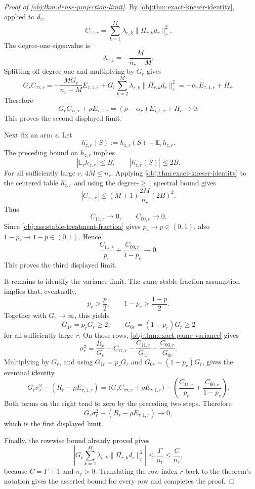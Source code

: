 \begin{proof}[Proof of \cref{obj:thm:dense-projection-limit}]
By \cref{obj:thm:exact-kneser-identity}, applied to \(d_r\),
\[
C_{\tau\tau,r}
=
\sum_{k=1}^{M}\lambda_{r,k}\|\Pi_{r,k}d_r\|_r^2 .
\]
The degree-one eigenvalue is
\[
\lambda_{r,1}=-\frac{M}{n_r-M}.
\]
Splitting off degree one and multiplying by \(G_r\) gives
\[
G_rC_{\tau\tau,r}
=
-\frac{MG_r}{n_r-M}E_{\tau,1,r}
+
G_r\sum_{k=2}^{M}\lambda_{r,k}\|\Pi_{r,k}d_r\|_r^2
=
-\alpha_r E_{\tau,1,r}+H_r .
\]
Therefore
\[
G_rC_{\tau\tau,r}+\rho E_{\tau,1,r}
=
(\rho-\alpha_r)E_{\tau,1,r}+H_r
\to0 .
\]
This proves the second displayed limit.

Next fix an arm \(z\).  Let
\[
h_{z,r}^{\circ}(S):=h_{z,r}(S)-\mathbb E_r h_{z,r}.
\]
The preceding bound on \(h_{z,r}\) implies
\[
|\mathbb E_r h_{z,r}|\le B,
\qquad
|h_{z,r}^{\circ}(S)|\le2B .
\]
For all sufficiently large \(r\), \(4M\le n_r\).  Applying \cref{obj:thm:exact-kneser-identity} to the centered table \(h_{z,r}^{\circ}\) and using the degree-\(\ge1\) spectral bound gives
\[
|C_{zz,r}|
\le
(M+1)\frac{2M}{n_r}(2B)^2 .
\]
Thus
\[
C_{11,r}\to0,
\qquad
C_{00,r}\to0 .
\]
Since \cref{obj:ass:stable-treatment-fraction} gives \(p_r\to p\in(0,1)\), also \(1-p_r\to1-p\in(0,1)\).  Hence
\[
\frac{C_{11,r}}{p_r}
+
\frac{C_{00,r}}{1-p_r}
\to0 .
\]
This proves the third displayed limit.

It remains to identify the variance limit.  The same stable-fraction assumption implies that, eventually,
\[
p_r>\frac p2,
\qquad
1-p_r>\frac{1-p}{2}.
\]
Together with \(G_r\to\infty\), this yields
\[
G_{1r}=p_rG_r\ge2,
\qquad
G_{0r}=(1-p_r)G_r\ge2
\]
for all sufficiently large \(r\).  On those rows, \cref{obj:thm:exact-pame-variance} gives
\[
\sigma_r^2
=
\frac{R_r}{G_r}
+
C_{\tau\tau,r}
-
\frac{C_{11,r}}{G_{1r}}
-
\frac{C_{00,r}}{G_{0r}} .
\]
Multiplying by \(G_r\), and using \(G_{1r}=p_rG_r\) and \(G_{0r}=(1-p_r)G_r\), gives the eventual identity
\[
G_r\sigma_r^2-(R_r-\rho E_{\tau,1,r})
=
\bigl(G_rC_{\tau\tau,r}+\rho E_{\tau,1,r}\bigr)
-
\left(
\frac{C_{11,r}}{p_r}
+
\frac{C_{00,r}}{1-p_r}
\right).
\]
Both terms on the right tend to zero by the preceding two steps.  Therefore
\[
G_r\sigma_r^2-(R_r-\rho E_{\tau,1,r})\to0,
\]
which is the first displayed limit.

Finally, the rowwise bound already proved gives
\[
\left|
G_r\sum_{k=2}^{M}\lambda_{r,k}\|\Pi_{r,k}d_r\|_r^2
\right|
\le
\frac{\Gamma}{n_r}
\le
\frac{C}{n_r},
\]
because \(C=\Gamma+1\) and \(n_r>0\).  Translating the row index \(r\) back to the theorem's notation gives the asserted bound for every row and completes the proof.
\end{proof}


